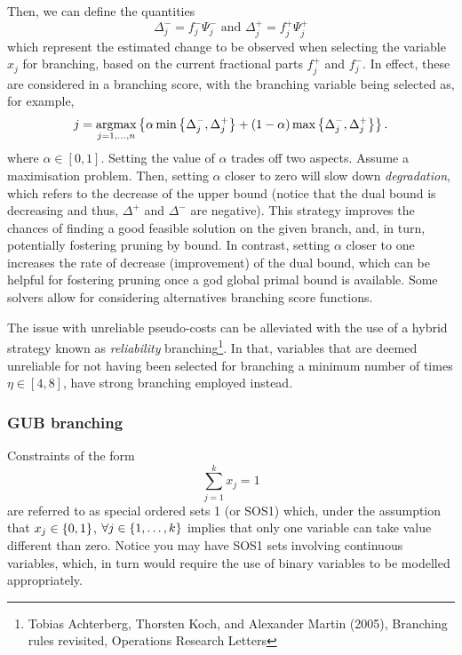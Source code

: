 Then, we can define the quantities
%
\begin{equation} \label{p1c11:eq:improvement_estimates}
	\Delta^-_j = f^-_j \Psi^-_j \text{ and } \Delta^+_j = f^+_j \Psi^+_j
\end{equation}
%
which represent the estimated change to be observed when selecting the variable $x_j$ for branching, based on the current fractional parts $f^+_j$ and $f^-_j$. In effect, these are considered in a branching score, with the branching variable being selected as, for example, 
%
\begin{equation*}
	j = \mathop{\rm argmax}_{j=1, \dots, n} \left\{  \alpha \min\left\{ \Delta^-_j, \Delta^+_j \right \} + (1-\alpha)\max\left\{ \Delta^-_j, \Delta^+_j \right \} \right \}.
\end{equation*}
%
where $\alpha \in [0,1]$. Setting the value of $\alpha$ trades off two aspects. Assume a maximisation problem. Then, setting $\alpha$ closer to zero will slow down \emph{degradation}, which refers to the decrease of the upper bound (notice that the dual bound is decreasing and thus, $\Delta^+$ and $\Delta^-$ are negative). This strategy improves the chances of finding a good feasible solution on the given branch, and, in turn, potentially fostering pruning by bound. In contrast, setting $\alpha$ closer to one increases the rate of decrease (improvement) of the dual bound, which can be helpful for fostering pruning once a god global primal bound is available. Some solvers allow for considering alternatives branching score functions. %

The issue with unreliable pseudo-costs can be alleviated with the use of a hybrid strategy known as \emph{reliability} branching\footnote{Tobias Achterberg, Thorsten Koch, and Alexander Martin (2005), Branching rules revisited, Operations Research Letters}. In that, variables that are deemed unreliable for not having been selected for branching a minimum number of times $\eta \in [4,8]$, have strong branching employed instead.   

 
\subsubsection{GUB branching}
 
Constraints of the form 
%
\begin{equation*}
	\sum_{j = 1}^k x_j = 1	
\end{equation*}
%
are referred to as special ordered sets 1 (or SOS1) which, under the assumption that $x_j \in \left\{ 0,1 \right \}$, $\forall j \in \left\{ 1,\dots,k \right \}$ implies that only one variable can take value different than zero. Notice you may have SOS1 sets involving continuous variables, which, in turn would require the use of binary variables to be modelled appropriately. 

